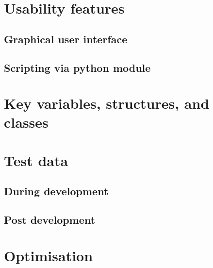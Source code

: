 \documentclass[11pt]{report}
\begin{document}
\section{Usability features}
\subsection{Graphical user interface}
\subsection{Scripting via python module}

\section{Key variables, structures, and classes}

\section{Test data}
\subsection{During development}
\subsection{Post development}

\section{Optimisation}
\end{document}

